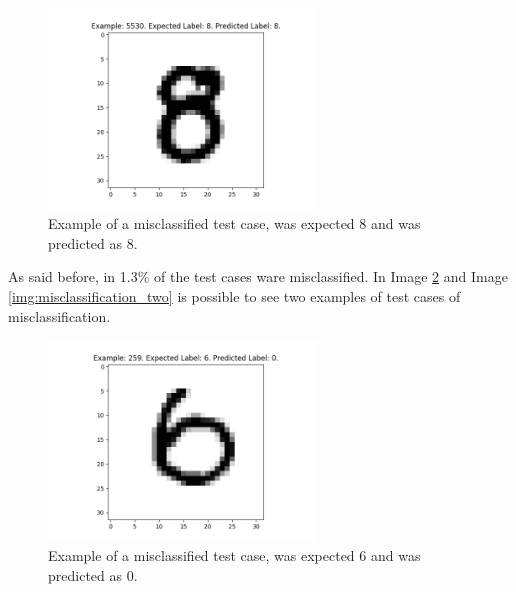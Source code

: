 \documentclass[journal]{IEEEtran}
\begin{document}
\begin{figure}
  \begin{center}
  \includegraphics[width=2.8in]{./../code/test_image_5530.png}
  \caption{Example of a misclassified test case, was expected 8 and was predicted as 8.}
  \label{img:classification_two}
  \end{center}
\end{figure}



As said before, in 1.3\% of the test cases ware misclassified. In Image \ref{img:misclassification_one} and Image \ref{img:misclassification_two} is possible to see two examples of test cases of misclassification.

\begin{figure}
  \begin{center}
  \includegraphics[width=2.8in]{./../code/misclassified_image_259.png}
  \caption{Example of a misclassified test case, was expected 6 and was predicted as 0.}
  \label{img:misclassification_one}
  \end{center}
\end{figure}
\end{document}
